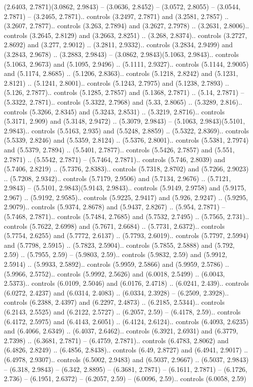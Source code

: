 (2.6403, 2.7871)(3.0862, 2.9843) -- (3.0636, 2.8452) -- (3.0572, 2.8055) -- (3.0544, 2.7871) -- (3.2465, 2.7871).. controls (3.2497, 2.7871) and (3.2581, 2.7857) .. (3.2607, 2.7877).. controls (3.263, 2.7894) and (3.2627, 2.7978) .. (3.2631, 2.8006).. controls (3.2645, 2.8129) and (3.2663, 2.8251) .. (3.268, 2.8374).. controls (3.2727, 2.8692) and (3.277, 2.9012) .. (3.2811, 2.9332).. controls (3.2834, 2.9499) and (3.2843, 2.9678) .. (3.2883, 2.9843) -- (3.0862, 2.9843)(5.1063, 2.9843).. controls (5.1063, 2.9673) and (5.1095, 2.9496) .. (5.1111, 2.9327).. controls (5.1144, 2.9005) and (5.1174, 2.8685) .. (5.1206, 2.8363).. controls (5.1218, 2.8242) and (5.1231, 2.8121) .. (5.1241, 2.8001).. controls (5.1243, 2.7975) and (5.1238, 2.7893) .. (5.126, 2.7877).. controls (5.1285, 2.7857) and (5.1368, 2.7871) .. (5.14, 2.7871) -- (5.3322, 2.7871).. controls (5.3322, 2.7968) and (5.33, 2.8065) .. (5.3289, 2.816).. controls (5.3266, 2.8345) and (5.3243, 2.8531) .. (5.3219, 2.8716).. controls (5.3171, 2.909) and (5.3148, 2.9472) .. (5.3079, 2.9843) -- (5.1063, 2.9843)(5.5101, 2.9843).. controls (5.5163, 2.935) and (5.5248, 2.8859) .. (5.5322, 2.8369).. controls (5.5339, 2.8246) and (5.5359, 2.8124) .. (5.5376, 2.8001).. controls (5.5381, 2.7974) and (5.5379, 2.7894) .. (5.5401, 2.7877).. controls (5.5426, 2.7857) and (5.551, 2.7871) .. (5.5542, 2.7871) -- (5.7464, 2.7871).. controls (5.746, 2.8039) and (5.7406, 2.8219) .. (5.7376, 2.8383).. controls (5.7318, 2.8702) and (5.7266, 2.9023) .. (5.7208, 2.9342).. controls (5.7179, 2.9506) and (5.7134, 2.9676) .. (5.7121, 2.9843) -- (5.5101, 2.9843)(5.9143, 2.9843).. controls (5.9149, 2.9758) and (5.9175, 2.967) .. (5.9192, 2.9585).. controls (5.9225, 2.9417) and (5.926, 2.9247) .. (5.9295, 2.9079).. controls (5.9374, 2.8678) and (5.9437, 2.8267) .. (5.954, 2.7871) -- (5.7468, 2.7871).. controls (5.7484, 2.7685) and (5.7532, 2.7495) .. (5.7565, 2.731).. controls (5.7622, 2.6998) and (5.7671, 2.6684) .. (5.7731, 2.6372).. controls (5.7754, 2.6255) and (5.7772, 2.6137) .. (5.7793, 2.6019).. controls (5.7797, 2.5994) and (5.7798, 2.5915) .. (5.7823, 2.5904).. controls (5.7855, 2.5888) and (5.792, 2.59) .. (5.7955, 2.59) -- (5.9803, 2.59).. controls (5.9832, 2.59) and (5.9912, 2.5914) .. (5.9933, 2.5892).. controls (5.9959, 2.5866) and (5.9959, 2.5786) .. (5.9966, 2.5752).. controls (5.9992, 2.5626) and (6.0018, 2.5499) .. (6.0043, 2.5373).. controls (6.0109, 2.5046) and (6.0176, 2.4718) .. (6.0241, 2.439).. controls (6.0272, 2.4237) and (6.0314, 2.4083) .. (6.0334, 2.3928) -- (6.2509, 2.3928).. controls (6.2388, 2.4397) and (6.2297, 2.4873) .. (6.2185, 2.5344).. controls (6.2143, 2.5525) and (6.2122, 2.5727) .. (6.2057, 2.59) -- (6.4178, 2.59).. controls (6.4172, 2.5975) and (6.4143, 2.6051) .. (6.4124, 2.6124).. controls (6.4093, 2.6235) and (6.4066, 2.6349) .. (6.4037, 2.6462).. controls (6.3921, 2.6931) and (6.3779, 2.7398) .. (6.3681, 2.7871) -- (6.4759, 2.7871).. controls (6.4783, 2.8062) and (6.4826, 2.8249) .. (6.4856, 2.8438).. controls (6.49, 2.8727) and (6.4941, 2.9017) .. (6.4978, 2.9307).. controls (6.5002, 2.9483) and (6.5037, 2.9667) .. (6.5037, 2.9843) -- (6.318, 2.9843) -- (6.342, 2.8895) -- (6.3681, 2.7871) -- (6.1611, 2.7871) -- (6.1726, 2.736) -- (6.1951, 2.6372) -- (6.2057, 2.59) -- (6.0096, 2.59).. controls (6.0058, 2.59) 